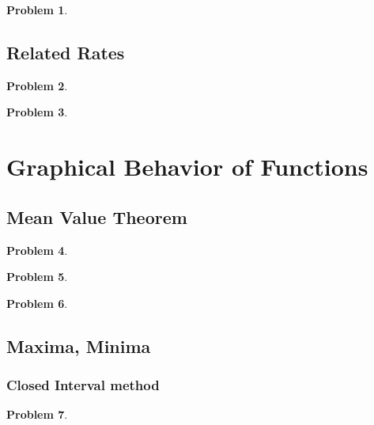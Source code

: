 \documentclass{article}
\newtheorem{problem}{Problem}
\begin{document}
\begin{problem}

\end{problem}

\subsection{Related Rates}\label{secMPSrelatedRates}
\begin{problem}

\end{problem}

\begin{problem}

\end{problem}


\section{Graphical Behavior of Functions}
\subsection{Mean Value Theorem}\label{secMPS-MVT}

\begin{problem}

\end{problem}

\begin{problem}

\end{problem}

\begin{problem}

\end{problem}


\subsection{Maxima, Minima}\label{secMPSoneVariableMinMax}
\subsubsection{Closed Interval method}\label{secMPSclosedInterval}
\begin{problem}

\end{problem}
\end{document}
